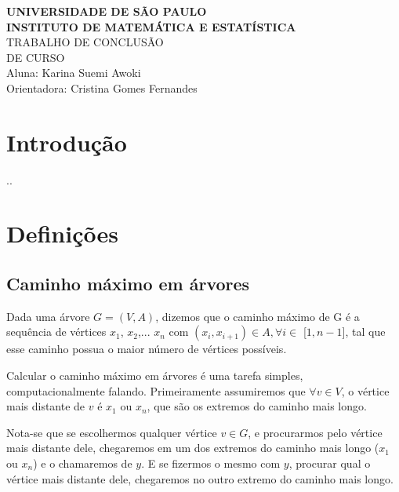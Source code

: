 \documentclass[a4paper,12pt]{article}
\begin{document}
\begin{center}
   {\large \textbf{UNIVERSIDADE DE SÃO PAULO}} \\[1.4cm]
   
   {\large \textbf{INSTITUTO DE MATEMÁTICA E ESTATÍSTICA}}\\[4.2cm]
   
   {\Huge TRABALHO DE CONCLUSÃO }\\[0.3cm]
   {\Huge DE CURSO }\\[9cm]
   
   {\large { Aluna: Karina Suemi Awoki}}\\[0.3cm]
   
   {\large { Orientadora: Cristina Gomes Fernandes}}
   

\end{center}

\newpage
\section{Introdução}
..
\bigskip

\section{Definições}
    
    \subsection{Caminho máximo em árvores}

        Dada uma árvore $G = (V,A)$, dizemos que o caminho máximo de G é a sequência de 
        vértices $x_1$, $x_2$,... $x_n$ com $(x_i, x_{i+1}) \in A, \forall i \in$ [$1, n-1$],
        tal que esse caminho possua o maior número de vértices possíveis.

        \bigskip



        Calcular o caminho máximo em árvores é uma tarefa simples, computacionalmente
        falando. Primeiramente assumiremos que $\forall v \in V$, o vértice mais distante
        de $v$ é $x_1$ ou $x_n$, que são os extremos do caminho mais longo.

        Nota-se que se escolhermos qualquer vértice $v \in G$, e procurarmos pelo vértice mais
        distante dele, chegaremos em um dos extremos do caminho mais longo ($x_1$ ou $x_n$) e o
        chamaremos de $y$.
        E se fizermos o mesmo com $y$, procurar qual o vértice mais distante dele, chegaremos no
        outro extremo do caminho mais longo.
        
\end{document}
